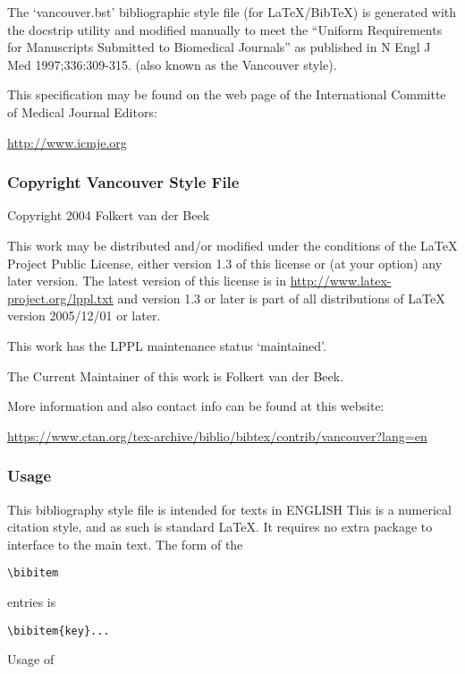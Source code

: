 \documentclass{jib}
\begin{document}
The `vancouver.bst' bibliographic style file (for LaTeX/BibTeX) is generated
with the docstrip utility and modified manually to meet the ``Uniform
Requirements for Manuscripts Submitted to Biomedical Journals'' as published in
N Engl J Med 1997;336:309-315. (also known as the Vancouver style).

This specification may be found on the web page of the International Committe of
Medical Journal Editors:

\url{http://www.icmje.org}

\subsubsection{Copyright Vancouver Style File}

Copyright 2004  Folkert van der Beek

This work may be distributed and/or modified under the conditions of the LaTeX
Project Public License, either version 1.3 of this license or (at your option)
any later version.
The latest version of this license is in
  \url{http://www.latex-project.org/lppl.txt}
and version 1.3 or later is part of all distributions of LaTeX version
2005/12/01 or later.

This work has the LPPL maintenance status `maintained'.

The Current Maintainer of this work is Folkert van der Beek.

More information and also contact info can be found at this website:

\url{https://www.ctan.org/tex-archive/biblio/bibtex/contrib/vancouver?lang=en}


\subsubsection{Usage}

This bibliography style file is intended for texts in ENGLISH
This is a numerical citation style, and as such is standard LaTeX.
It requires no extra package to interface to the main text.
The form of the
 
\begin{lstlisting}
\bibitem
\end{lstlisting}
 

entries is

\begin{lstlisting}
\bibitem{key}...
\end{lstlisting}
  
Usage of 
\end{document}
